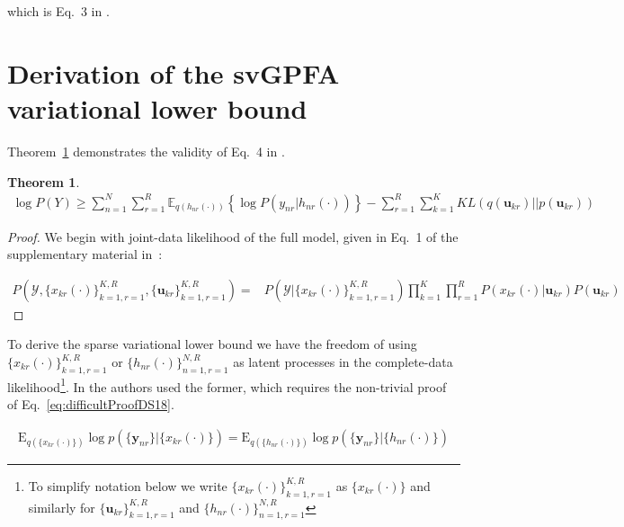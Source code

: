 \documentclass[12pt]{article}
\newtheorem{theorem}{Theorem}
\begin{document}
\noindent which is Eq.~3 in \citet{dunckerAndSahani18}.

\section{Derivation of the svGPFA variational lower bound}

Theorem~\ref{thm:variationalLowerBound} demonstrates the validity of Eq.~4 in
\citet{dunckerAndSahani18}.

\begin{theorem}
    \begin{align}
        \log
        P(Y)\ge\sum_{n=1}^N\sum_{r=1}^R\mathbb{E}_{q\left(h_{nr}(\cdot)\right)}\left\{\log P(y_{nr}|h_{nr}(\cdot))\right\}-\sum_{r=1}^R\sum_{k=1}^KKL(q(\mathbf{u}_{kr})||p(\mathbf{u}_{kr}))
    \end{align}
    \label{thm:variationalLowerBound}
\end{theorem}

\begin{proof}
    We begin with joint-data likelihood of the full model, given in Eq.~1 of
    the supplementary material in~\citet{dunckerAndSahani18}:

    \begin{align}
        P\left(\mathcal{Y},\{x_{kr}(\cdot)\}_{k=1,r=1}^{K,R},\{\mathbf{u}_{kr}\}_{k=1,r=1}^{K,R}\right)=&P\left(\mathcal{Y}|\{x_{kr}(\cdot)\}_{k=1,r=1}^{K,R}\right)\prod_{k=1}^K\prod_{r=1}^RP(x_{kr}(\cdot)|\mathbf{u}_{kr})P(\mathbf{u}_{kr})
    \end{align}
\end{proof}

To derive the sparse variational lower bound we have the freedom of using
$\{x_{kr}(\cdot)\}_{k=1,r=1}^{K,R}$ or $\{h_{nr}(\cdot)\}_{n=1,r=1}^{N,R}$ as
latent processes in the complete-data likelihood\footnote{To simplify notation below we write
$\{x_{kr}(\cdot)\}_{k=1,r=1}^{K,R}$ as $\{x_{kr}(\cdot)\}$ and similarly for $\{\mathbf{u}_{kr}\}_{k=1,r=1}^{K,R}$ and $\{h_{nr}(\cdot)\}_{n=1,r=1}^{N,R}$}. In
\cite{dunckerAndSahani18supplementary} the authors used the former, which
requires the non-trivial proof of Eq.~\ref{eq:difficultProofDS18}.

\begin{align}
    \text{E}_{q(\{x_{kr}(\cdot)\})}\log p(\{\mathbf{y}_{nr}\}|\{x_{kr}(\cdot)\})=\text{E}_{q(\{h_{nr}(\cdot)\})}\log p(\{\mathbf{y}_{nr}\}|\{h_{nr}(\cdot)\})
    \label{eq:difficultProofDS18}
\end{align}
\end{document}
